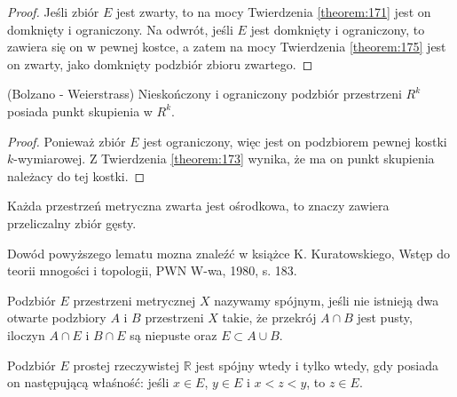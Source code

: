 \documentclass[leqno]{article}
\begin{document}
\begin{justify}
\begin{proof}
    Jeśli zbiór $E$ jest zwarty, to na mocy Twierdzenia \ref{theorem:171} jest on domknięty i ograniczony.
    Na odwrót, jeśli $E$ jest domknięty i ograniczony, to zawiera się on w pewnej kostce, a zatem na mocy Twierdzenia \ref{theorem:175} jest on zwarty,
    jako domknięty podzbiór zbioru zwartego.
\end{proof}

\begin{theorem}
{
    (Bolzano - Weierstrass) Nieskończony i ograniczony podzbiór przestrzeni $R^k$ posiada punkt skupienia w $R^k$.
}
\end{theorem}

\begin{proof}
    Ponieważ zbiór $E$ jest ograniczony, więc jest on podzbiorem pewnej kostki $k$-wymiarowej.
    Z Twierdzenia \ref{theorem:173} wynika, że ma on punkt skupienia należacy do tej kostki.
\end{proof}

\begin{lemat}
{
    Każda przestrzeń metryczna zwarta jest ośrodkowa, to znaczy zawiera przeliczalny zbiór gęsty.
}
\end{lemat}

Dowód powyższego lematu mozna znaleźć w książce K. Kuratowskiego, Wstęp do teorii mnogości i topologii, PWN W-wa, 1980, s. 183.

\begin{defn}
    Podzbiór $E$ przestrzeni metrycznej $X$ nazywamy spójnym, jeśli nie istnieją dwa otwarte podzbiory $A$ i $B$ przestrzeni $X$
    takie, że przekrój $A \cap B$ jest pusty, iloczyn $A \cap E$ i $B \cap E$ są niepuste oraz $E \subset A \cup B$.
\end{defn}

\begin{theorem}
    Podzbiór $E$ prostej rzeczywistej $\mathbb{R}$ jest spójny wtedy i tylko wtedy, gdy posiada on następującą 
    właśność: jeśli $x \in E$, $y \in E$ i $x < z < y$, to $z \in E$.
\end{theorem}


\end{justify}
\end{document}
